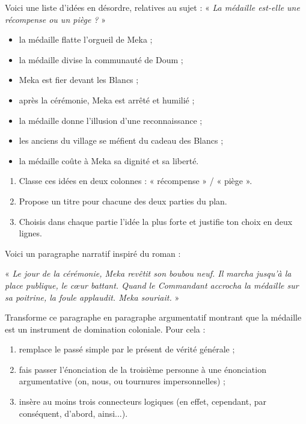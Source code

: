 \documentclass[11pt]{article}
\begin{document}
\begin{exercice}
Voici une liste d'idées en désordre, relatives au sujet : « \emph{La médaille est-elle une récompense ou un piège ?} »

\begin{itemize}
\item la médaille flatte l'orgueil de Meka ;
\item la médaille divise la communauté de Doum ;
\item Meka est fier devant les Blancs ;
\item après la cérémonie, Meka est arrêté et humilié ;
\item la médaille donne l'illusion d'une reconnaissance ;
\item les anciens du village se méfient du cadeau des Blancs ;
\item la médaille coûte à Meka sa dignité et sa liberté.
\end{itemize}

\begin{enumerate}
\item Classe ces idées en deux colonnes : « récompense » / « piège ».
\item Propose un titre pour chacune des deux parties du plan.
\item Choisis dans chaque partie l'idée la plus forte et justifie ton choix en deux lignes.
\end{enumerate}
\end{exercice}

\begin{exercice}
Voici un paragraphe narratif inspiré du roman :

« \emph{Le jour de la cérémonie, Meka revêtit son boubou neuf. Il marcha jusqu'à la place publique, le cœur battant. Quand le Commandant accrocha la médaille sur sa poitrine, la foule applaudit. Meka souriait.} »

Transforme ce paragraphe en paragraphe argumentatif montrant que la médaille est un instrument de domination coloniale. Pour cela :
\begin{enumerate}
\item remplace le passé simple par le présent de vérité générale ;
\item fais passer l'énonciation de la troisième personne à une énonciation argumentative (on, nous, ou tournures impersonnelles) ;
\item insère au moins trois connecteurs logiques (en effet, cependant, par conséquent, d'abord, ainsi...).
\end{enumerate}
\end{exercice}
\end{document}
